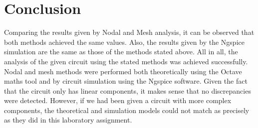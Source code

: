 \section{Conclusion}
\label{sec:conclusion}
Comparing the results given by Nodal and Mesh analysis, it can be observed that both methods achieved the same values. Also, the results given by the Ngspice simulation are the same as those of the methods stated above.  
All in all, the analysis of the given circuit using the stated methods was achieved successfully. Nodal and mesh methods were performed both theoretically using the Octave maths tool and by circuit simulation using the Ngspice software. 
Given the fact that the circuit only has linear components, it makes sense that no discrepancies were detected. However, if we had been given a circuit with more complex components, the theoretical and simulation models could not match as precisely as they did in this laboratory assignment.

